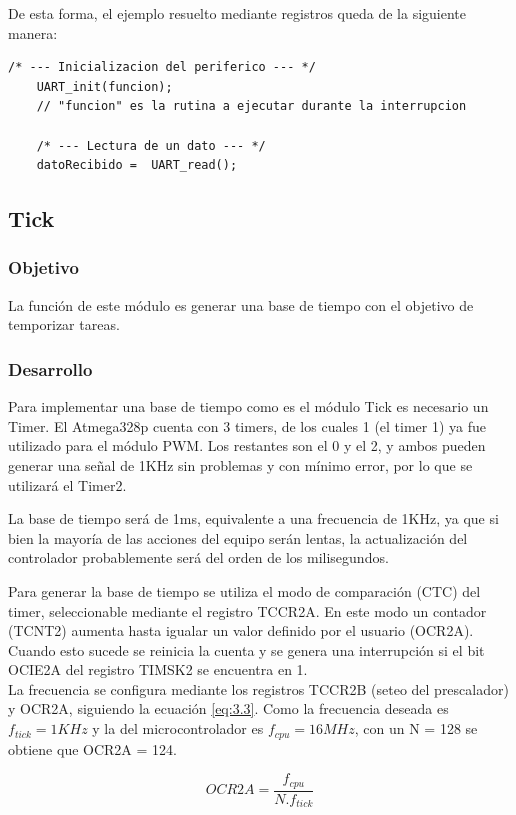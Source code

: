 De esta forma, el ejemplo resuelto mediante registros queda de la siguiente manera:
\begin{lstlisting}[style=CStyle]
	/* --- Inicializacion del periferico --- */
	UART_init(funcion); 
	// "funcion" es la rutina a ejecutar durante la interrupcion
	
	/* --- Lectura de un dato --- */
	datoRecibido =  UART_read();
\end{lstlisting}

\subsection{Tick}
\subsubsection{Objetivo}
La función de este módulo es generar una base de tiempo con el objetivo de temporizar tareas.

\subsubsection{Desarrollo}
Para implementar una base de tiempo como es el módulo Tick es necesario un Timer. El Atmega328p cuenta con 3 timers, de los cuales 1 (el timer 1) ya fue utilizado para el módulo PWM. Los restantes son el 0 y el 2, y ambos pueden generar una señal de 1KHz sin problemas y con mínimo error, por lo que se utilizará el Timer2.

La base de tiempo será de 1ms, equivalente a una frecuencia de 1KHz, ya que si bien la mayoría de las acciones del equipo serán lentas, la actualización del controlador probablemente será del orden de los milisegundos.

Para generar la base de tiempo se utiliza el modo de comparación (CTC) del timer, seleccionable mediante el registro TCCR2A. En este modo un contador (TCNT2) aumenta hasta igualar un valor definido por el usuario (OCR2A). Cuando esto sucede se reinicia la cuenta y se genera una interrupción si el bit OCIE2A del registro TIMSK2 se encuentra en 1.\\
La frecuencia se configura mediante los registros TCCR2B (seteo del prescalador) y OCR2A, siguiendo la ecuación \ref{eq:3.3}. Como la frecuencia deseada es \(f_{tick} = 1KHz\) y la del microcontrolador es \(f_{cpu} = 16MHz\), con un N = 128 se obtiene que OCR2A = 124.

\begin{equation} \label{eq:\theequation}
OCR2A = \frac{f_{cpu}}{N.f_{tick}}
\end{equation}

